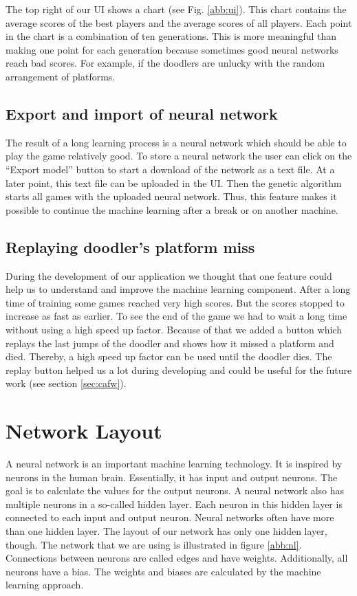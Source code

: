 \documentclass[a4paper,12pt,pagesize,headsepline,bibtotoc,titlepage,abstracton]{scrartcl}
\begin{document}
The top right of our UI shows a chart (see Fig. \ref{abb:ui}). This chart contains the average scores of the best players and the average scores of all players. Each point in the chart is a combination of ten generations. This is more meaningful than making one point for each generation because sometimes good neural networks reach bad scores. For example, if the doodlers are unlucky with the random arrangement of platforms.

\subsection{Export and import of neural network}

The result of a long learning process is a neural network which should be able to play the game relatively good. To store a neural network the user can click on the ``Export model'' button to start a download of the network as a text file. At a later point, this text file can be uploaded in the UI. Then the genetic algorithm starts all games with the uploaded neural network. Thus, this feature makes it possible to continue the machine learning after a break or on another machine.

\subsection{Replaying doodler's platform miss}
\label{sec:rdpm}

During the development of our application we thought that one feature could help us to understand and improve the machine learning component. After a long time of training some games reached very high scores. But the scores stopped to increase as fast as earlier. To see the end of the game we had to wait a long time without using a high speed up factor. Because of that we added a button which replays the last jumps of the doodler and shows how it missed a platform and died. Thereby, a high speed up factor can be used until the doodler dies. The replay button helped us a lot during developing and could be useful for the future work (see section \ref{sec:cafw}).

\section{Network Layout}

A neural network is an important machine learning technology. It is inspired by neurons in the human brain. Essentially, it has input and output neurons. The goal is to calculate the values for the output neurons. A neural network also has multiple neurons in a so-called hidden layer. Each neuron in this hidden layer is connected to each input and output neuron. Neural networks often have more than one hidden layer. The layout of our network has only one hidden layer, though. The network that we are using is illustrated in figure \ref{abb:nl}. Connections between neurons are called edges and have weights. Additionally, all neurons have a bias. The weights and biases are calculated by the machine learning approach.
\end{document}

